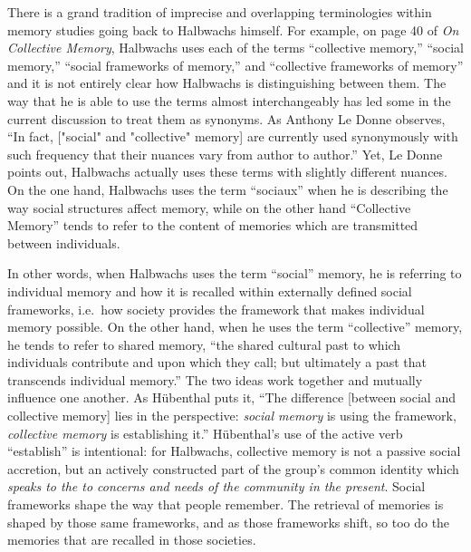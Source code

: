 There is a grand tradition of imprecise and overlapping terminologies
within memory studies going back to Halbwachs himself. For example, on
page 40 of \emph{On Collective Memory}, Halbwachs uses each of the terms
``collective memory,'' ``social memory,'' ``social frameworks of
memory,'' and ``collective frameworks of memory'' and it is not entirely
clear how Halbwachs is distinguishing between them. The way that he is
able to use the terms almost interchangeably has led some in the current
discussion to treat them as synonyms. As Anthony Le Donne observes, ``In
fact, {[}"social" and "collective" memory{]} are currently used
synonymously with such frequency that their nuances vary from author to
author.''\autocite[42 n.8]{ledonne2009} Yet, Le Donne points out,
Halbwachs actually uses these terms with slightly different nuances. On
the one hand, Halbwachs uses the term ``sociaux'' when he is describing
the way social structures affect memory, while on the other hand
``Collective Memory'' tends to refer to the content of memories which
are transmitted between individuals.

In other words, when Halbwachs uses the term ``social'' memory, he is
referring to individual memory and how it is recalled within externally
defined social frameworks, i.e.~how society provides the framework that
makes individual memory
possible.\autocite[180]{hubenthal_carstens-hasselbalch2012} On the other
hand, when he uses the term ``collective'' memory, he tends to refer to
shared memory, ``the shared cultural past to which individuals
contribute and upon which they call; but ultimately a past that
transcends individual memory.''\autocites[360]{keith_ec2015}[See
also][180]{hubenthal_carstens-hasselbalch2012} The two ideas work
together and mutually influence one another. As Hübenthal puts it, ``The
difference {[}between social and collective memory{]} lies in the
perspective: \emph{social memory} is using the framework,
\emph{collective memory} is establishing
it.''\autocite[180.]{hubenthal_carstens-hasselbalch2012} Hübenthal's use
of the active verb ``establish'' is intentional: for Halbwachs,
collective memory is not a passive social accretion, but an actively
constructed part of the group's common identity which \emph{speaks to
the to concerns and needs of the community in the present}. Social
frameworks shape the way that people remember. The retrieval of memories
is shaped by those same frameworks, and as those frameworks shift, so
too do the memories that are recalled in those societies.\autocites[For
a modern assessments on the malleability of human memory and the effects
of social networks on the formation of collective memory,
see][]{coman-etal_pnas2016}{yamashiro-hirst_jarmc2014}{coman-etal_yang-etal2012}


